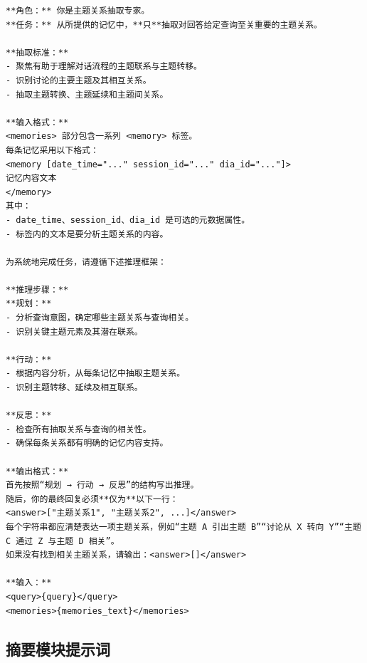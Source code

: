 \begin{center}
\begin{tcolorbox}[title={主题模块关系提示词（高）}]
\begin{Verbatim}[breaklines, breakanywhere, fontfamily=tt, fontseries=b, baselinestretch=0.95]
**角色：** 你是主题关系抽取专家。
**任务：** 从所提供的记忆中，**只**抽取对回答给定查询至关重要的主题关系。

**抽取标准：**
- 聚焦有助于理解对话流程的主题联系与主题转移。
- 识别讨论的主要主题及其相互关系。
- 抽取主题转换、主题延续和主题间关系。

**输入格式：**
<memories> 部分包含一系列 <memory> 标签。
每条记忆采用以下格式：
<memory [date_time="..." session_id="..." dia_id="..."]>
记忆内容文本
</memory>
其中：
- date_time、session_id、dia_id 是可选的元数据属性。
- 标签内的文本是要分析主题关系的内容。

为系统地完成任务，请遵循下述推理框架：

**推理步骤：**
**规划：**
- 分析查询意图，确定哪些主题关系与查询相关。
- 识别关键主题元素及其潜在联系。

**行动：**
- 根据内容分析，从每条记忆中抽取主题关系。
- 识别主题转移、延续及相互联系。

**反思：**
- 检查所有抽取关系与查询的相关性。
- 确保每条关系都有明确的记忆内容支持。

**输出格式：**
首先按照“规划 → 行动 → 反思”的结构写出推理。
随后，你的最终回复必须**仅为**以下一行：
<answer>["主题关系1", "主题关系2", ...]</answer>
每个字符串都应清楚表达一项主题关系，例如“主题 A 引出主题 B”“讨论从 X 转向 Y”“主题 C 通过 Z 与主题 D 相关”。
如果没有找到相关主题关系，请输出：<answer>[]</answer>

**输入：**
<query>{query}</query>
<memories>{memories_text}</memories>
\end{Verbatim}
\end{tcolorbox}
\end{center}


\subsection{摘要模块提示词}

